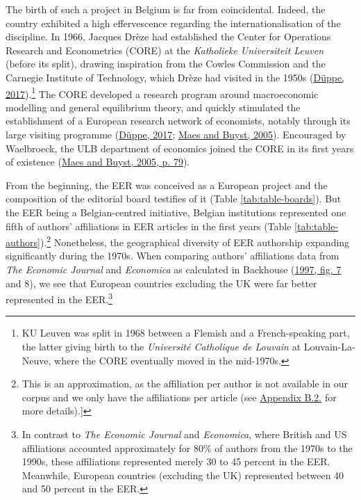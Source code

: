 \documentclass[
  12pt,
  onecolumn]{article}
\begin{document}
The birth of such a project in Belgium is far from coincidental. Indeed, the country exhibited a high effervescence regarding the internationalisation of the discipline. In 1966, Jacques Drèze had established the Center for Operations Research and Econometrics (CORE) at the \emph{Katholieke Universiteit Leuven} (before its split), drawing inspiration from the Cowles Commission and the Carnegie Institute of Technology, which Drèze had visited in the 1950s (\protect\hyperlink{ref-duppe2017}{Düppe, 2017}).\footnote{KU Leuven was split in 1968 between a Flemish and a French-speaking part, the latter giving birth to the \emph{Université Catholique de Louvain} at Louvain-La-Neuve, where the CORE eventually moved in the mid-1970s.} The CORE developed a research program around macroeconomic modelling and general equilibrium theory, and quickly stimulated the establishment of a European research network of economists, notably through its large visiting programme (\protect\hyperlink{ref-duppe2017}{Düppe, 2017}; \protect\hyperlink{ref-maes2005}{Maes and Buyst, 2005}). Encouraged by Waelbroeck, the ULB department of economics joined the CORE in its first years of existence (\protect\hyperlink{ref-maes2005}{Maes and Buyst, 2005, p. 79}).

From the beginning, the EER was conceived as a European project and the composition of the editorial board testifies of it (Table \ref{tab:table-boards}). But the EER being a Belgian-centred initiative, Belgian institutions represented one fifth of authors' affiliations in EER articles in the first years (Table \ref{tab:table-authors}).\footnote{This is an approximation, as the affiliation per author is not available in our corpus and we only have the affiliations per article (see \protect\hyperlink{author-affiliation}{Appendix B.2.} for more details).{]}} Nonetheless, the geographical diversity of EER authorship expanding significantly during the 1970s. When comparing authors' affiliations data from \emph{The Economic Journal} and \emph{Economica} as calculated in Backhouse (\protect\hyperlink{ref-backhouse1997a}{1997, fig. 7} and 8), we see that European countries excluding the UK were far better represented in the EER.\footnote{In contrast to \emph{The Economic Journal} and \emph{Economica}, where British and US affiliations accounted approximately for 80\% of authors from the 1970s to the 1990s, these affiliations represented merely 30 to 45 percent in the EER. Meanwhile, European countries (excluding the UK) represented between 40 and 50 percent in the EER.}
\end{document}
